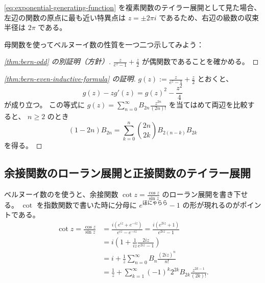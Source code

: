 {\autoref{eq:exponential-generating-function} を複素関数のテイラー展開として見た場合、左辺の関数の原点に最も近い特異点は $z=\pm 2\pi i$ であるため、右辺の級数の収束半径は $2\pi$ である。

母関数を使ってベルヌーイ数の性質を一つ二つ示してみよう：
\begin{proof}[\autoref{thm:bern-odd} の別証明（方針）]
  $\frac{z}{e^z-1}+\frac{z}{2}$ が偶関数であることを確かめる。
\end{proof}

\begin{proof}[\autoref{thm:bern-even-inductive-formula} の証明]
  $g(z):=\frac{z}{e^z-1}+\frac{z}{2}$ とおくと、
  \[g(z)-zg'(z)=g(z)^2-\frac{z^2}{4}\]
  が成り立つ。
  この等式に $g(z)=\sum_{n=0}^\infty B_{2n}\frac{z^{2n}}{(2n)!}$ を当てはめて両辺を比較すると、 $n\ge 2$ のとき
  \[(1-2n)B_{2n}=\sum_{k=0}^n\binom{2n}{2k}B_{2(n-k)}B_{2k}\]
  を得る。
\end{proof}


\subsection{余接関数のローラン展開と正接関数のテイラー展開}

ベルヌーイ数のを使うと、余接関数 $\cot z=\frac{\cos z}{\sin z}$ のローラン展開を書き下せる。
$\cot$ を指数関数で書いた時に分母に $e^{\text{ほにゃらら}}-1$ の形が現れるのがポイントである。
\begin{align*}
  \cot z=\frac{\cos z}{\sin z}
  &=\frac{i(e^{iz}+e^{-iz})}{e^{iz}-e^{-iz}}
    =\frac{i(e^{2iz}+1)}{e^{2iz}-1} \\
  &=i\left(1+\frac{1}{iz}\frac{2iz}{e^{2iz}-1}\right) \\
  &=i+\frac{1}{z}\sum_{n=0}^\infty B_n\frac{(2iz)^n}{n!} \\
  &=\frac{1}{z}+\sum_{k=1}^\infty (-1)^k 2^{2k} B_{2k}\frac{z^{2k-1}}{(2k)!}.
\end{align*}

}
